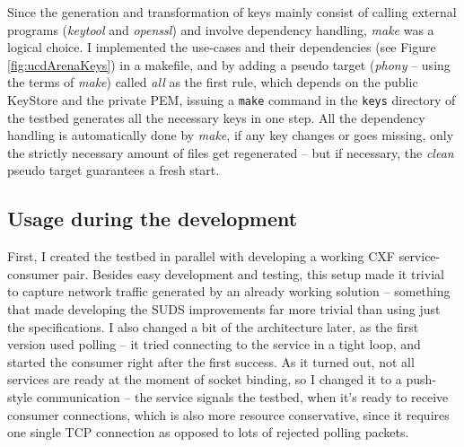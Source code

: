 Since the generation and transformation of keys mainly consist of calling external programs (\emph{keytool} and \emph{openssl}) and involve dependency handling, \emph{make} was a logical choice. I implemented the use-cases and their dependencies (see Figure \ref{fig:ucdArenaKeys}) in a makefile, and by adding a pseudo target (\emph{phony} -- using the terms of \emph{make}) called \emph{all} as the first rule, which depends on the public KeyStore and the private PEM, issuing a \verb|make| command in the \verb|keys| directory of the testbed generates all the necessary keys in one step. All the dependency handling is automatically done by \emph{make}, if any key changes or goes missing, only the strictly necessary amount of files get regenerated -- but if necessary, the \emph{clean} pseudo target guarantees a fresh start.

\subsection{Usage during the development}

First, I created the testbed in parallel with developing a working CXF service-consumer pair. Besides easy development and testing, this setup made it trivial to capture network traffic generated by an already working solution -- something that made developing the SUDS improvements far more trivial than using just the specifications. I also changed a bit of the architecture later, as the first version used polling -- it tried connecting to the service in a tight loop, and started the consumer right after the first success. As it turned out, not all services are ready at the moment of socket binding, so I changed it to a push-style communication -- the service signals the testbed, when it's ready to receive consumer connections, which is also more resource conservative, since it requires one single TCP connection as opposed to lots of rejected polling packets.
